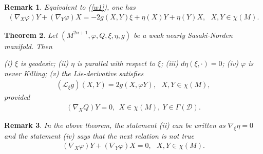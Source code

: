 \documentclass{article}
\newtheorem{theorem}{Theorem}
\newtheorem{remark}[theorem]{Remark}
\begin{document}
\begin{remark}
Equivalent to (\ref{w1}), one has 	
\begin{eqnarray}
	(\nabla_X\varphi)Y+(\nabla_Y\varphi)X=-2g(X,Y)\xi+\eta(X)Y+\eta(Y)X, \ \ \ X,Y\in\chi(M).  \label{w2}
\end{eqnarray}	
\end{remark}

\begin{theorem} \label{t3}
	Let $(M^{2n+1},\varphi,Q,\xi,\eta, g)$ be a weak nearly Sasaki-Norden manifold. Then \medskip
	
	\noindent (i) $\xi$ is geodesic; (ii) $\eta$ is parallel with respect to $\xi$;  (iii) $d\eta(\xi,\cdot)=0$; (iv) $\varphi$ is never Killing; (v) the Lie-derivative satisfies
\begin{eqnarray}
	(\mathcal{L}_{\xi}g)(X,Y)=2g(X,\varphi Y), \ \ \ X,Y\in\chi(M),   \label{w5}
\end{eqnarray} 
provided 
\begin{eqnarray}
	(\nabla_XQ)Y=0, \ \  X\in\chi(M), \ Y\in\Gamma(\mathcal{D}). \label{w7}
\end{eqnarray} 
\end{theorem}

\begin{remark}
	In the above theorem, the statement (ii) can be written as  $\nabla_{\xi}\eta=0$ and the statement (iv) says that  the next relation is not true
	\begin{eqnarray}
		(\nabla_X\varphi)Y+(\nabla_Y\varphi)X=0, \ \ \ X,Y\in\chi(M). \label{w4}
	\end{eqnarray}
\end{remark}
\end{document}
